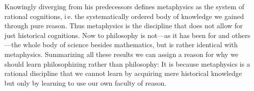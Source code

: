 Knowingly diverging from his predecessors  defines
metaphysics as the system of rational cognitions, i\,e. the systematically
ordered body of knowledge we gained through pure reason. Thus metaphysics is the
discipline that does not allow for just historical cognitions. Now to
 philosophy is not---as it has been for
 and
others---the whole body of science besides mathematics, but is rather identical
with metaphysics. Summarizing all these results we can assign a reason for why
we should learn philosophizing rather than philosophy: It is because metaphysics
is a rational discipline that we cannot learn by acquiring mere historical
knowledge but only by learning to use our own faculty of reason.
